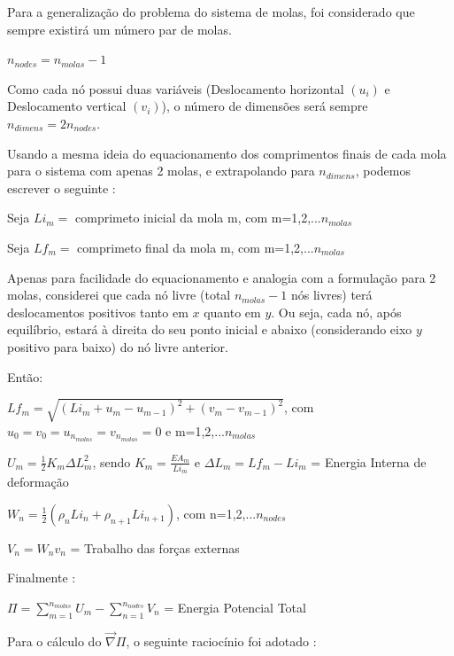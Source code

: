 \documentclass[10pt, a4paper]{article}
\begin{document}
Para a generalização do problema do sistema de molas, foi considerado que sempre existirá um número par de molas.

$n_{nodes} = n_{molas} -1$

Como cada nó possui duas variáveis (Deslocamento horizontal $(u_i)$ e Deslocamento vertical $(v_i)$), o número de dimensões
será sempre $n_{dimens} = 2n_{nodes}$.

Usando a mesma ideia do equacionamento dos comprimentos finais de cada mola para o sistema com apenas 2 molas, e
extrapolando para $n_{dimens}$, podemos escrever o seguinte :

\vspace{3mm}
Seja $Li_m = $ comprimeto inicial da mola m, com m=1,2,...$n_{molas}$

\vspace{3mm}
Seja $Lf_m = $ comprimeto final da mola m, com m=1,2,...$n_{molas}$

\vspace{3mm}
Apenas para facilidade do equacionamento e analogia com a formulação para 2 molas, 
considerei que cada nó livre (total $n_{molas} - 1$ nós livres) terá deslocamentos positivos tanto em $x$ quanto em $y$. Ou seja,
cada nó, após equilíbrio, estará à direita do seu ponto inicial e abaixo (considerando eixo $y$ positivo para baixo) do nó livre anterior.

\vspace{3mm}
Então:

\vspace{3mm}
$Lf_m = \sqrt{(Li_m + u_m - u_{m-1})^2 + (v_m - v_{m-1})^2}$, com $u_0 = v_0 = u_{n_{molas}} = v_{n_{molas}} = 0 $ e m=1,2,...$n_{molas}$

\vspace{3mm}
$U_m = \frac{1}{2}K_m\Delta L_m^2$, sendo $K_m = \frac{EA_m}{Li_m}$ e $\Delta L_m = Lf_m - Li_m$ = Energia Interna de deformação

\vspace{3mm}
$W_n = \frac{1}{2}(\rho_n Li_n + \rho_{n+1} Li_{n+1})$, com n=1,2,...$n_{nodes}$

\vspace{3mm}
$V_n = W_nv_n$ = Trabalho das forças externas

\vspace{3mm}
Finalmente :

\vspace{3mm}
$\Pi = \sum_{m=1}^{n_{molas}}{U_m} - \sum_{n=1}^{n_{nodes}}{V_n}$ = Energia Potencial Total

\vspace{3mm}
Para o cálculo do $\overrightarrow{\nabla} \Pi$, o seguinte raciocínio foi adotado :
\end{document}
